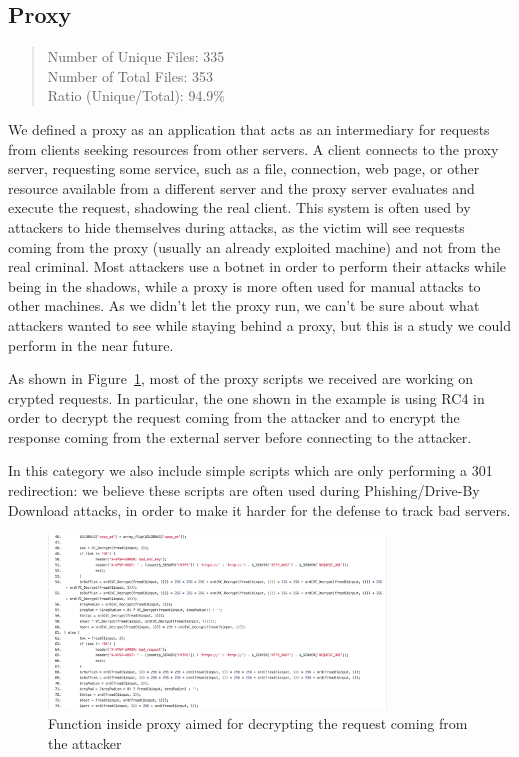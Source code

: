 \subsection{Proxy}

\begin{quote}
Number of Unique Files: 335\\
Number of Total Files: 353\\
Ratio (Unique/Total): 94.9\%
\end{quote}

We defined a proxy as an application that acts as an intermediary for requests from clients seeking resources from other servers. A client connects to the proxy server, requesting some service, such as a file, connection, web page, or other resource available from a different server and the proxy server evaluates and execute the request, shadowing the real client. This system is often used by attackers to hide themselves during attacks, as the victim will see requests coming from the proxy (usually an already exploited machine) and not from the real criminal.
Most attackers use a botnet in order to perform their attacks while being in the shadows, while a proxy is more often used for manual attacks to other machines. As we didn't let the proxy run, we can't be sure about what attackers wanted to see while staying behind a proxy, but this is a study we could perform in the near future.

As shown in Figure~\ref{fig:Proxy}, most of the proxy scripts we received are working on crypted requests. In particular, the one shown in the example is using RC4 in order to decrypt the request coming from the attacker and to encrypt the response coming from the external server before connecting to the attacker.

In this category we also include simple scripts which are only performing a 301 redirection: we believe these scripts are often used during Phishing/Drive-By Download attacks, in order to make it harder for the defense to track bad servers.

\begin{figure}[H]
\centerline{\includegraphics[width=0.8\textwidth]{Images/Proxy.jpg}}
\caption{Function inside proxy aimed for decrypting the request coming from the attacker\label{fig:Proxy}}
\end{figure}

